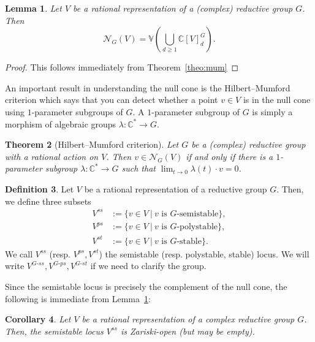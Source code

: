\documentclass[11pt]{amsart}
\newtheorem{theorem}{Theorem}[section]
\newtheorem{corollary}[theorem]{Corollary}
\newtheorem{lemma}[theorem]{Lemma}
\theoremstyle{definition}
\newtheorem{definition}[theorem]{Definition}
\newcommand{\C}{{\mathbb C}}
\begin{document}
\begin{lemma} \label{null.cone.Z-closed}
Let $V$ be a rational representation of a (complex) reductive group $G$. Then
$$
\mathcal{N}_G(V) = \mathbb{V} \left(\bigcup_{d \geq 1} \C[V]^G_d\right).
$$
\end{lemma}

\begin{proof}
This follows immediately from Theorem~\ref{theo:mum}
\end{proof}



An important result in understanding the null cone is the Hilbert--Mumford criterion which says that you can detect whether a point $v \in V$ is in the null cone using $1$-parameter subgroups of $G$. A $1$-parameter subgroup of $G$ is simply a morphism of algebraic groups $\lambda: \C^* \rightarrow G$.


\begin{theorem} [Hilbert--Mumford criterion] \label{theo:HM-crit}
Let $G$ be a (complex) reductive group with a rational action on $V$. Then $v \in \mathcal{N}_G(V)$ if and only if there is a $1$-parameter subgroup $\lambda: \C^* \rightarrow G$ such that $\lim_{t \rightarrow 0} \lambda(t)\cdot v = 0$.
\end{theorem}






\begin{definition}
Let $V$ be a rational representation of a reductive group $G$. Then, we define three subsets
\begin{align*}
V^{ss} & := \{v \in V \ |\ v \text{ is $G$-semistable}\}, \\ 
V^{ps} & := \{v \in V \ |\ v \text{ is $G$-polystable}\}, \\
V^{st} & := \{v \in V \ |\ v \text{ is $G$-stable}\}.
\end{align*}
We call $V^{ss}$ (resp. $V^{ps}, V^{st}$) the semistable (resp. polystable, stable) locus. We will write $V^{G\text{-}ss}, V^{G\text{-}ps}, V^{G\text{-}st}$ if we need to clarify the group. 
\end{definition}

Since the semistable locus is precisely the complement of the null cone, the following is immediate from Lemma~\ref{null.cone.Z-closed}:

\begin{corollary} \label{ss-locus-open}
Let $V$ be a rational representation of a complex reductive group $G$. Then, the semistable locus $V^{ss}$ is Zariski-open (but may be empty).
\end{corollary}
\end{document}
